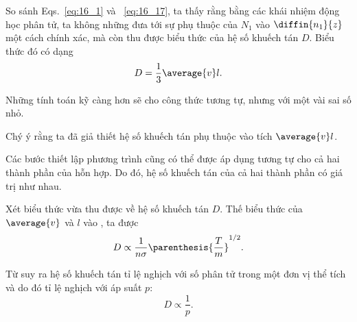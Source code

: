 So sánh Eqs.~\eqref{eq:16_1} và ~\eqref{eq:16_17}, ta thấy rằng bằng các khái nhiệm động học phân tử, ta không những đưa tới sự phụ thuộc của $N_1$ vào $\diffin{n_1}{z}$ một cách chính xác, mà còn thu được biểu thức của hệ số khuếch tán $D$. Biểu thức đó có dạng
\begin{equation}\label{eq:16_18}
    D = \frac{1}{3} \average{v} l. 
\end{equation}

\noindent
Những tính toán kỹ càng hơn sẽ cho công thức tương tự, nhưng với một vài sai số nhỏ.

Chý ý rằng ta đã giả thiết hệ số khuếch tán phụ thuộc vào tích $\average{v}l$.

Các bước thiết lập phương trình  cũng có thể được áp dụng tương tự cho cả hai thành phần của hỗn hợp. Do đó, hệ số khuếch tán của cả hai thành phần có giá trị như nhau.

Xét biểu thức vừa thu được về hệ số khuếch tán $D$. Thế biểu thức của $\average{v}$ và $l$ vào , ta được
\begin{equation}\label{eq:16_19}
    D \propto \frac{1}{n\sigma} \parenthesis{\frac{T}{m}}^{1/2}.
\end{equation} 

\noindent
Từ  suy ra hệ số khuếch tán tỉ lệ nghịch với số phân tử trong một đơn vị thể tích và do đó tỉ lệ nghịch với áp suất $p$:
\begin{equation*}
    D \propto \frac{1}{p}.
\end{equation*}

